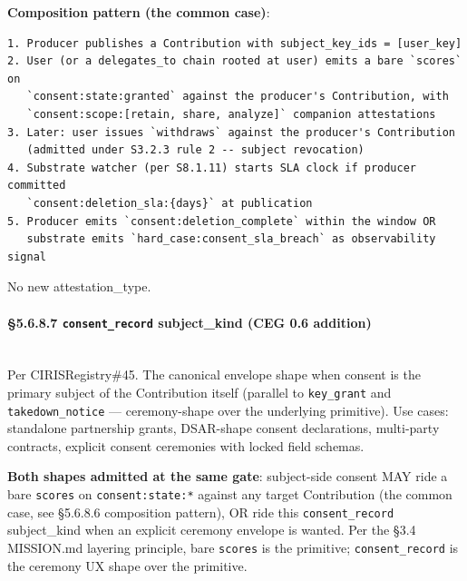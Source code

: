 \documentclass[11pt]{article}
\begin{document}
\textbf{Composition pattern (the common case)}:


\begin{lstlisting}
1. Producer publishes a Contribution with subject_key_ids = [user_key]
2. User (or a delegates_to chain rooted at user) emits a bare `scores` on
   `consent:state:granted` against the producer's Contribution, with
   `consent:scope:[retain, share, analyze]` companion attestations
3. Later: user issues `withdraws` against the producer's Contribution
   (admitted under S3.2.3 rule 2 -- subject revocation)
4. Substrate watcher (per S8.1.11) starts SLA clock if producer committed
   `consent:deletion_sla:{days}` at publication
5. Producer emits `consent:deletion_complete` within the window OR
   substrate emits `hard_case:consent_sla_breach` as observability signal
\end{lstlisting}

No new attestation\_type.


\paragraph{§5.6.8.7 \texttt{consent\_record} subject\_kind (CEG 0.6 addition)}\mbox{}\\


Per CIRISRegistry\#45. The canonical envelope shape when consent is the primary subject of the Contribution itself (parallel to \texttt{key\_grant} and \texttt{takedown\_notice} — ceremony-shape over the underlying primitive). Use cases: standalone partnership grants, DSAR-shape consent declarations, multi-party contracts, explicit consent ceremonies with locked field schemas.


\textbf{Both shapes admitted at the same gate}: subject-side consent MAY ride a bare \texttt{scores} on \texttt{consent:state:*} against any target Contribution (the common case, see §5.6.8.6 composition pattern), OR ride this \texttt{consent\_record} subject\_kind when an explicit ceremony envelope is wanted. Per the §3.4 MISSION.md layering principle, bare \texttt{scores} is the primitive; \texttt{consent\_record} is the ceremony UX shape over the primitive.
\end{document}
